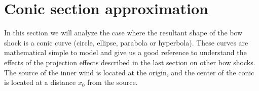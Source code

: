 \section{Conic section approximation}
\label{sec:conic}

\newcommand\Sin{\ensuremath{\mathcal{S}}}
\newcommand\Cos{\ensuremath{\mathcal{C}}}
\newcommand\Cot{\ensuremath{\mathcal{T}}}

In this section we will analyze the case where the resultant shape  of the bow shock is a conic curve (circle, ellipse, parabola or hyperbola).
These curves are mathematical simple to model and give us a good reference to understand the effects of the projection effects
described in the last section on other bow shocks. The source of the inner wind is located at the origin, and the center of the conic is located at
a distance $x_0$ from the source.

